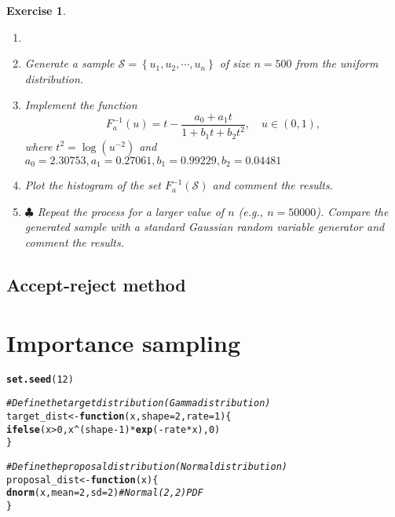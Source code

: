 \documentclass{article}\usepackage[]{graphicx}\usepackage[]{xcolor}
\makeatletter
\newcommand{\hlnum}[1]{\textcolor[rgb]{0.686,0.059,0.569}{#1}}%
\newcommand{\hlcom}[1]{\textcolor[rgb]{0.678,0.584,0.686}{\textit{#1}}}%
\newcommand{\hlopt}[1]{\textcolor[rgb]{0,0,0}{#1}}%
\newcommand{\hldef}[1]{\textcolor[rgb]{0.345,0.345,0.345}{#1}}%
\newcommand{\hlkwa}[1]{\textcolor[rgb]{0.161,0.373,0.58}{\textbf{#1}}}%
\newcommand{\hlkwb}[1]{\textcolor[rgb]{0.69,0.353,0.396}{#1}}%
\newcommand{\hlkwc}[1]{\textcolor[rgb]{0.333,0.667,0.333}{#1}}%
\newcommand{\hlkwd}[1]{\textcolor[rgb]{0.737,0.353,0.396}{\textbf{#1}}}%
\newenvironment{kframe}{%
 \def\at@end@of@kframe{}%
 \ifinner\ifhmode%
  \def\at@end@of@kframe{\end{minipage}}%
  \begin{minipage}{\columnwidth}%
 \fi\fi%
 \def\FrameCommand##1{\hskip\@totalleftmargin \hskip-\fboxsep
 \colorbox{shadecolor}{##1}\hskip-\fboxsep
     \hskip-\linewidth \hskip-\@totalleftmargin \hskip\columnwidth}%
 \MakeFramed {\advance\hsize-\width
   \@totalleftmargin\z@ \linewidth\hsize
   \@setminipage}}%
 {\par\unskip\endMakeFramed%
 \at@end@of@kframe}
\newenvironment{knitrout}{}{} %
\newtheorem{exercise}{Exercise}
\makeatother
\begin{document}
  \begin{exercise}
  \begin{enumerate}
  \item[] 
  \item Generate a sample $\mathcal{S} = \left\{u_1, u_2, \cdots, u_n\right\}$ of size $n = 500$ from the uniform distribution.
  
  \item Implement the function
  \[
  F_a^{-1}(u) = t - \frac{a_0 + a_1t}{1+b_1t+b_2t^2}, \quad u\in(0,1),
  \]
  where $t^2 = \log\left(u^{-2}\right)$ and $a_0 = 2.30753, a_1 = 0.27061, b_1 = 0.99229, b_2 = 0.04481$
  
  \item Plot the histogram of the set $F_a^{-1}(\mathcal{S})$ and comment the results.
  
  \item$\clubsuit$ Repeat the process for a larger value of $n$ (e.g., $n = 50000$). Compare the generated sample with a standard Gaussian random variable generator and comment the results.
  
  \end{enumerate}
  \end{exercise}

\subsection{Accept-reject method}

\newpage
\section{Importance sampling}

\begin{knitrout}
\color{fgcolor}\begin{kframe}
\begin{alltt}
\hlkwd{set.seed}\hldef{(}\hlnum{12}\hldef{)}

\hlcom{# Define the target distribution (Gamma distribution)}
\hldef{target_dist} \hlkwb{<-} \hlkwa{function}\hldef{(}\hlkwc{x}\hldef{,} \hlkwc{shape} \hldef{=} \hlnum{2}\hldef{,} \hlkwc{rate} \hldef{=} \hlnum{1}\hldef{) \{}
  \hlkwd{ifelse}\hldef{(x} \hlopt{>} \hlnum{0}\hldef{, x}\hlopt{^}\hldef{(shape} \hlopt{-} \hlnum{1}\hldef{)} \hlopt{*} \hlkwd{exp}\hldef{(}\hlopt{-}\hldef{rate} \hlopt{*} \hldef{x),} \hlnum{0}\hldef{)}
\hldef{\}}

\hlcom{# Define the proposal distribution (Normal distribution)}
\hldef{proposal_dist} \hlkwb{<-} \hlkwa{function}\hldef{(}\hlkwc{x}\hldef{) \{}
  \hlkwd{dnorm}\hldef{(x,} \hlkwc{mean} \hldef{=} \hlnum{2}\hldef{,} \hlkwc{sd} \hldef{=} \hlnum{2}\hldef{)}  \hlcom{# Normal(2, 2) PDF}
\hldef{\}}
\end{alltt}
\end{kframe}
\end{knitrout}
\end{document}
